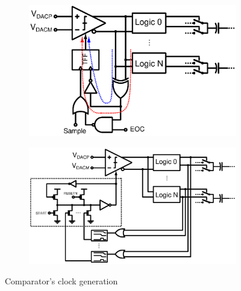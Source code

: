 \begin{figure}[htp]
	\centering
	\begin{subfigure}[b]{0.48\textwidth}
		\includegraphics[width=\textwidth]{Chapter3/Figs/sar_logic_JChen2011.ps}
		\label{fig:sar_logic_jchen2011}
	\end{subfigure}
	\begin{subfigure}[b]{0.44\textwidth}
		\includegraphics[width=\textwidth]{Chapter3/Figs/sar_logic_wong2013.ps}
		\label{fig:sar_logic_wong2013}
	\end{subfigure}
	\caption{Comparator's clock generation}
	\label{fig:sar_cmp_clock}
\end{figure}

